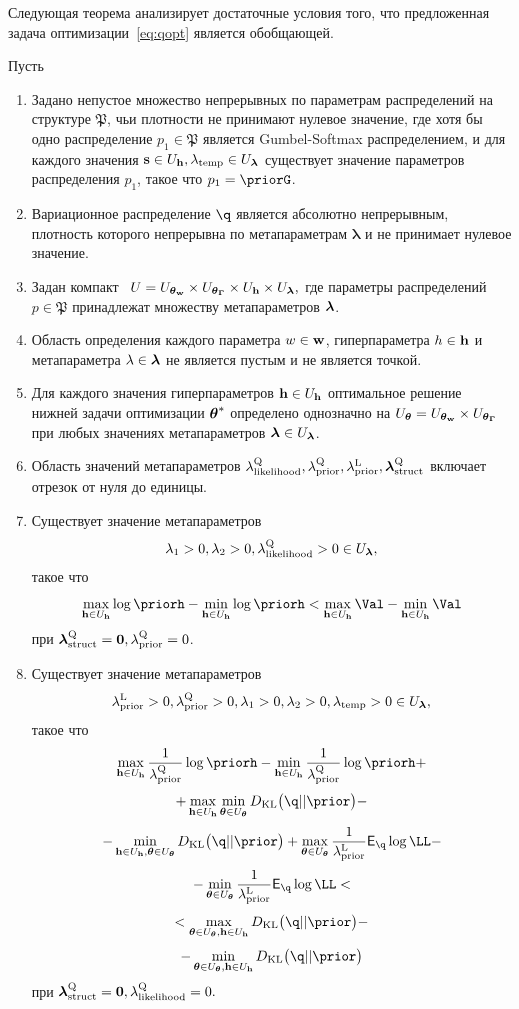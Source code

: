 Следующая теорема анализирует достаточные условия того, что предложенная задача оптимизации~\eqref{eq:qopt} является обобщающей.
\begin{theorem}
Пусть
\begin{enumerate}%
\item Задано непустое множество непрерывных по параметрам распределений на структуре $\mathfrak{P}$, чьи плотности не принимают нулевое значение, где хотя бы одно распределение $p_1 \in \mathfrak{P}$ является Gumbel-Softmax распределением, и для каждого значения $\mathbf{s} \in U_{\mathbf{h}}, \lambda_{\text{temp}} \in U_{\boldsymbol{\lambda}}$ существует значение параметров распределения $p_1$, такое что $p_1 = \priorG$.

\item Вариационное распределение $\q$ является  абсолютно непрерывным, плотность которого непрерывна по метапараметрам $\boldsymbol{\lambda}$ и не принимает нулевое значение.

\item Задан компакт  $U = U_{\boldsymbol{\theta}_\mathbf{w}} \times U_{\boldsymbol{\theta}_{\boldsymbol{\Gamma}}} \times U_{\mathbf{h}} \times U_{\boldsymbol{\lambda}},$ где параметры распределений $p \in \mathfrak{P}$ принадлежат множеству метапараметров $\boldsymbol{\lambda}$.

\item Область определения каждого параметра $w \in\mathbf{w}$, гиперпараметра $h \in \mathbf{h}$ и метапараметра $\lambda \in \boldsymbol{\lambda}$ не является пустым и не является точкой.

\item Для каждого значения гиперпараметров $\mathbf{h} \in U_{\mathbf{h}}$ оптимальное решение нижней задачи оптимизации $\boldsymbol{\theta}^{*}$ определено однозначно на $U_{\boldsymbol{\theta}} = U_{\boldsymbol{\theta}_\mathbf{w}} \times U_{\boldsymbol{\theta}_{\boldsymbol{\Gamma}}}$ при любых значениях метапараметров $\boldsymbol{\lambda} \in U_{\boldsymbol{\lambda}}$.

\item Область значений метапараметров $\lambda_\text{likelihood}^\text{Q}, \lambda_\text{prior}^\text{Q}, \lambda_\text{prior}^\text{L}, \boldsymbol{\lambda}_\text{struct}^\text{Q}$ включает отрезок от нуля до единицы.

\item Существует значение метапараметров $$\lambda_1>0, \lambda_2>0, \lambda_\text{likelihood}^\text{Q}>0  \in U_{\boldsymbol{\lambda}},$$ такое что
\[
\max_{\h \in \Uh} \log \priorh -\min_{\h \in \Uh}\log \priorh < \max_{\h \in \Uh} \Val - \min_{\h \in \Uh} \Val
\] 
при $\boldsymbol{\lambda}_\text{struct}^\text{Q} = \mathbf{0}, \lambda_\text{prior}^\text{Q} = 0$.

\item Существует значение метапараметров $$\lambda_\text{prior}^\text{L}>0, \lambda_\text{prior}^\text{Q}>0, \lambda_1>0, \lambda_2>0, \lambda_{\text{temp}}>0 \in U_{\boldsymbol{\lambda}},$$ такое что 
\[
    \max_{\h \in \Uh} \frac{1}{\lamCQ}\log  \priorh - \min_{\h \in \Uh} \frac{1}{\lamCQ}\log  \priorh +
\]
\[
 + \max_{\h \in \Uh} \min_{\teta \in \Uteta} \KL{\q}{\prior} -
\]
\[ -\min_{\h \in \Uh, \teta \in \Uteta}  \KL{\q}{\prior} + \max_{\teta \in \Uteta}\frac{1}{\lamCL}\E_{\q} \log \LL - 
\]
\[
 - \min_{\teta \in \Uteta}\frac{1}{\lamCL}\E_{\q} \log \LL  <
\]
\[ 
< \max_{\teta \in \Uteta, \h \in \Uh} \KL{\q}{\prior} -
\]
\[
-\min_{\teta \in \Uteta, \h \in \Uh} \KL{\q}{\prior}
\]
при $\boldsymbol{\lambda}_\text{struct}^\text{Q} = \mathbf{0}, \lambda_\text{likelihood}^\text{Q} = 0.$


\end{enumerate}
\end{theorem}
